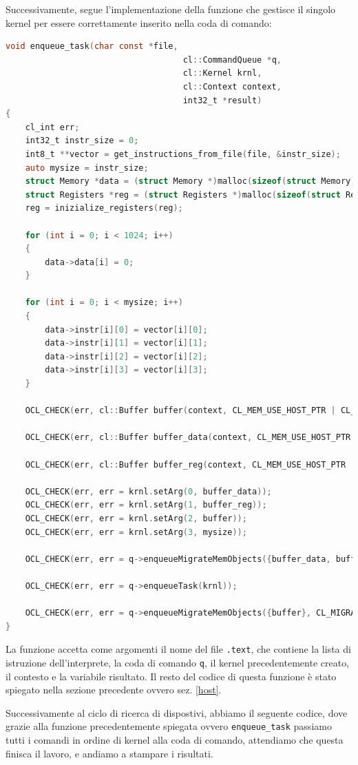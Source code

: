 Successivamente, segue l'implementazione della funzione che gestisce il singolo kernel per essere correttamente inserito nella coda di comando:
\begin{lstlisting}[language=C,caption={enqueue task},label={enqueuetask}]
void enqueue_task(char const *file,
									cl::CommandQueue *q,
									cl::Kernel krnl,
									cl::Context context,
									int32_t *result)
{
	cl_int err;
	int32_t instr_size = 0;
	int8_t **vector = get_instructions_from_file(file, &instr_size);
	auto mysize = instr_size;
	struct Memory *data = (struct Memory *)malloc(sizeof(struct Memory));
	struct Registers *reg = (struct Registers *)malloc(sizeof(struct Registers));
	reg = inizialize_registers(reg);

	for (int i = 0; i < 1024; i++)
	{
		data->data[i] = 0;
	}

	for (int i = 0; i < mysize; i++)
	{
		data->instr[i][0] = vector[i][0];
		data->instr[i][1] = vector[i][1];
		data->instr[i][2] = vector[i][2];
		data->instr[i][3] = vector[i][3];
	}

	OCL_CHECK(err, cl::Buffer buffer(context, CL_MEM_USE_HOST_PTR | CL_MEM_WRITE_ONLY, sizeof(int32_t), result, &err));

	OCL_CHECK(err, cl::Buffer buffer_data(context, CL_MEM_USE_HOST_PTR | CL_MEM_READ_ONLY, sizeof(struct Memory), data, &err));

	OCL_CHECK(err, cl::Buffer buffer_reg(context, CL_MEM_USE_HOST_PTR | CL_MEM_READ_ONLY, sizeof(struct Registers), reg, &err));

	OCL_CHECK(err, err = krnl.setArg(0, buffer_data));
	OCL_CHECK(err, err = krnl.setArg(1, buffer_reg));
	OCL_CHECK(err, err = krnl.setArg(2, buffer));
	OCL_CHECK(err, err = krnl.setArg(3, mysize));

	OCL_CHECK(err, err = q->enqueueMigrateMemObjects({buffer_data, buffer_reg}, 0 /* 0 means from host*/));

	OCL_CHECK(err, err = q->enqueueTask(krnl));

	OCL_CHECK(err, err = q->enqueueMigrateMemObjects({buffer}, CL_MIGRATE_MEM_OBJECT_HOST));
}
\end{lstlisting}
La funzione accetta come argomenti il nome del file \texttt{.text}, che contiene la lista di istruzione dell'interprete, la coda di comando \texttt{q}, il kernel precedentemente creato, il contesto e la variabile risultato.
Il resto del codice di questa funzione è stato spiegato nella sezione precedente ovvero sez. \ref{host}.

Successivamente al ciclo di ricerca di dispostivi, abbiamo il seguente codice, dove grazie alla funzione precedentemente spiegata ovvero \texttt{enqueue\_task} passiamo tutti i comandi in ordine di kernel alla coda di comando, attendiamo che questa finisca il lavoro, e andiamo a stampare i risultati.

